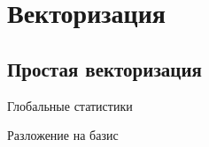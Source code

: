 \section{Векторизация}

\subsection{Простая векторизация}

\begin{frame}{Глобальные статистики}
    
\end{frame}

\begin{frame}{Разложение на базис}
    
\end{frame}






